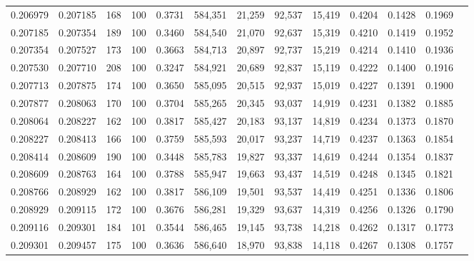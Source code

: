 \begin{tabular}{rrrrrrrrrrrrr}
0.206979 & 0.207185 &   168 & 100 &                                     0.3731 & 584,351 &  21,259 &  92,537 &  15,419 & 0.4204 & 0.1428 & 0.1969 \\
0.207185 & 0.207354 &   189 & 100 &                                     0.3460 & 584,540 &  21,070 &  92,637 &  15,319 & 0.4210 & 0.1419 & 0.1952 \\
0.207354 & 0.207527 &   173 & 100 &                                     0.3663 & 584,713 &  20,897 &  92,737 &  15,219 & 0.4214 & 0.1410 & 0.1936 \\
0.207530 & 0.207710 &   208 & 100 &                                     0.3247 & 584,921 &  20,689 &  92,837 &  15,119 & 0.4222 & 0.1400 & 0.1916 \\
0.207713 & 0.207875 &   174 & 100 &                                     0.3650 & 585,095 &  20,515 &  92,937 &  15,019 & 0.4227 & 0.1391 & 0.1900 \\
0.207877 & 0.208063 &   170 & 100 &                                     0.3704 & 585,265 &  20,345 &  93,037 &  14,919 & 0.4231 & 0.1382 & 0.1885 \\
0.208064 & 0.208227 &   162 & 100 &                                     0.3817 & 585,427 &  20,183 &  93,137 &  14,819 & 0.4234 & 0.1373 & 0.1870 \\
0.208227 & 0.208413 &   166 & 100 &                                     0.3759 & 585,593 &  20,017 &  93,237 &  14,719 & 0.4237 & 0.1363 & 0.1854 \\
0.208414 & 0.208609 &   190 & 100 &                                     0.3448 & 585,783 &  19,827 &  93,337 &  14,619 & 0.4244 & 0.1354 & 0.1837 \\
0.208609 & 0.208763 &   164 & 100 &                                     0.3788 & 585,947 &  19,663 &  93,437 &  14,519 & 0.4248 & 0.1345 & 0.1821 \\
0.208766 & 0.208929 &   162 & 100 &                                     0.3817 & 586,109 &  19,501 &  93,537 &  14,419 & 0.4251 & 0.1336 & 0.1806 \\
0.208929 & 0.209115 &   172 & 100 &                                     0.3676 & 586,281 &  19,329 &  93,637 &  14,319 & 0.4256 & 0.1326 & 0.1790 \\
0.209116 & 0.209301 &   184 & 101 &                                     0.3544 & 586,465 &  19,145 &  93,738 &  14,218 & 0.4262 & 0.1317 & 0.1773 \\
0.209301 & 0.209457 &   175 & 100 &                                     0.3636 & 586,640 &  18,970 &  93,838 &  14,118 & 0.4267 & 0.1308 & 0.1757 \\

\end{tabular}
